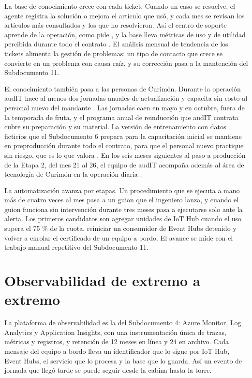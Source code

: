 La base de conocimiento crece con cada ticket. Cuando un caso se resuelve, el agente registra la solución
o mejora el artículo que usó, y cada mes se revisan los artículos más consultados y los que no
resolvieron. Así el centro de soporte aprende de la operación, como pide , y la
base lleva métricas de uso y de utilidad percibida durante todo el contrato . El
análisis mensual de tendencia de los tickets alimenta la gestión de problemas: un tipo de contacto que
crece se convierte en un problema con causa raíz, y su corrección pasa a la mantención del
Subdocumento 11.

El conocimiento también pasa a las personas de Curimón. Durante la operación audIT hace al menos dos
jornadas anuales de actualización y capacita sin costo al personal nuevo del mandante
. Las jornadas caen en mayo y en octubre, fuera de la temporada de fruta, y el
programa anual de reinducción que audIT contrata cubre su preparación y su material. La versión de
entrenamiento con datos ficticios que el Subdocumento 6 prepara para la capacitación inicial se mantiene
en preproducción durante todo el contrato, para que el personal nuevo practique sin riesgo, que es lo
que valora . En los seis meses siguientes al paso a producción de la Etapa 2, del
mes 21 al 26, el equipo de audIT acompaña además al área de tecnología de Curimón en la operación diaria
.

La automatización avanza por etapas. Un procedimiento que se ejecuta a mano más de cuatro veces al mes
pasa a un guion que el ingeniero lanza, y cuando el guion funciona sin intervención durante tres meses
pasa a ejecutarse solo ante la alerta. Los primeros candidatos son agregar unidades de IoT Hub cuando
el uso supera el 75 \% de la cuota, reiniciar un consumidor de Event Hubs detenido y volver a enrolar el
certificado de un equipo a bordo. El avance se mide con el trabajo manual repetitivo del Subdocumento
11.

\section{Observabilidad de extremo a extremo}\label{sec:10-observabilidad-de-extremo-a-extr}

La plataforma de observabilidad es la del Subdocumento 4: Azure Monitor, Log Analytics y Application
Insights, con una instrumentación única de trazas, métricas y registros, y retención de 12 meses en línea
y 24 en archivo. Cada mensaje del equipo a bordo lleva un identificador que lo sigue por IoT Hub, Event
Hubs, el servicio que lo procesa y la base que lo guarda. Así un evento de jornada que llegó tarde se
puede seguir desde la cabina hasta la torre.

